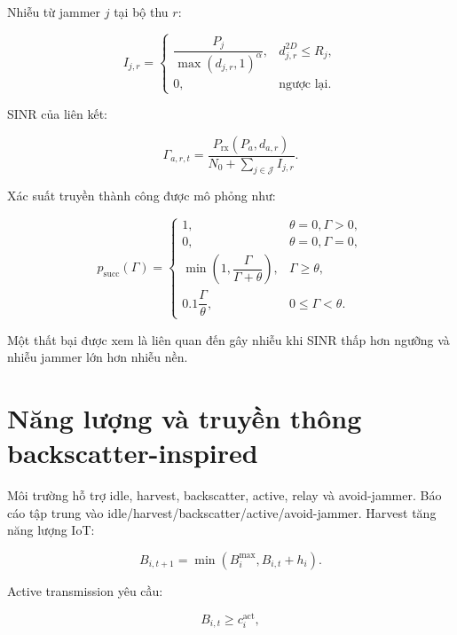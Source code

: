 Nhiễu từ jammer \(j\) tại bộ thu \(r\):

\begin{equation}
I_{j,r}=
\begin{cases}
\dfrac{P_j}{\max(d_{j,r},1)^{\alpha}}, & d^{2D}_{j,r}\le R_j,\\
0, & \text{ngược lại}.
\end{cases}
\label{eq:jammer_interference}
\end{equation}

SINR của liên kết:

\begin{equation}
\Gamma_{a,r,t}=
\frac{P_{\mathrm{rx}}(P_a,d_{a,r})}
{N_0+\sum_{j\in\mathcal{J}}I_{j,r}}.
\label{eq:sinr}
\end{equation}

Xác suất truyền thành công được mô phỏng như:

\begin{equation}
p_{\mathrm{succ}}(\Gamma)=
\begin{cases}
1, & \theta=0,\Gamma>0,\\
0, & \theta=0,\Gamma=0,\\
\min\left(1,\dfrac{\Gamma}{\Gamma+\theta}\right), & \Gamma\ge\theta,\\
0.1\dfrac{\Gamma}{\theta}, & 0\le\Gamma<\theta.
\end{cases}
\label{eq:success_probability}
\end{equation}

Một thất bại được xem là liên quan đến gây nhiễu khi SINR thấp hơn ngưỡng và nhiễu jammer lớn hơn nhiễu nền.

\section{Năng lượng và truyền thông backscatter-inspired}

Môi trường hỗ trợ idle, harvest, backscatter, active, relay và avoid-jammer. Báo cáo tập trung vào idle/harvest/backscatter/active/avoid-jammer. Harvest tăng năng lượng IoT:

\begin{equation}
B_{i,t+1}=\min(B_i^{\max},B_{i,t}+h_i).
\label{eq:harvest_energy}
\end{equation}

Active transmission yêu cầu:

\begin{equation}
B_{i,t}\ge c_i^{\mathrm{act}},
\label{eq:active_constraint}
\end{equation}

